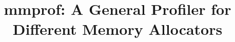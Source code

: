 \documentclass[pageno]{jpaper}
\begin{document}
\title{mmprof: A General Profiler for Different Memory Allocators}
\date{}
\maketitle

\thispagestyle{empty}










%

{


}
\end{document}
